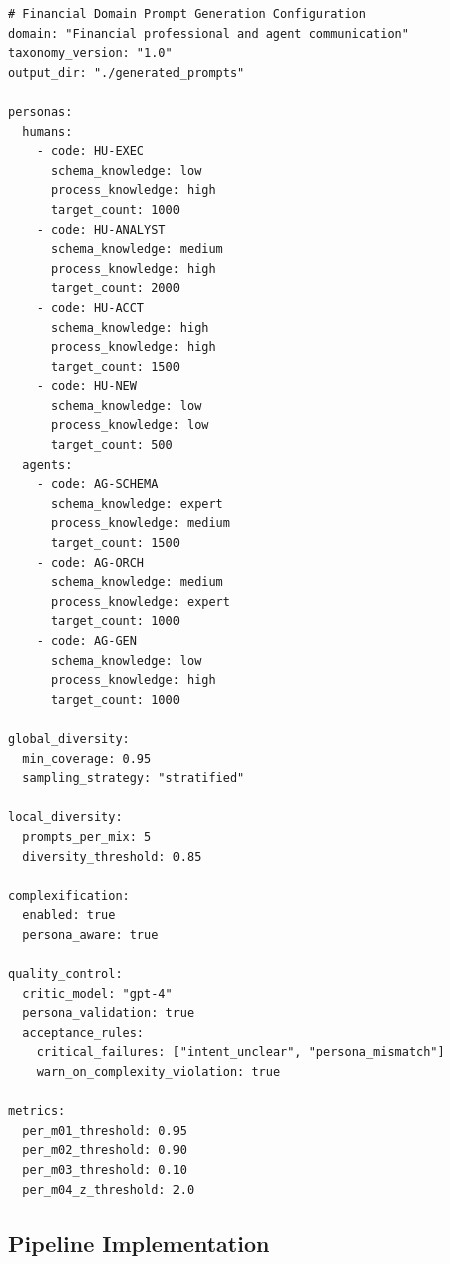 \begin{lstlisting}[language=yamlx,caption={financial\_prompt\_config.yaml}]
# Financial Domain Prompt Generation Configuration
domain: "Financial professional and agent communication"
taxonomy_version: "1.0"
output_dir: "./generated_prompts"

personas:
  humans:
    - code: HU-EXEC
      schema_knowledge: low
      process_knowledge: high
      target_count: 1000
    - code: HU-ANALYST
      schema_knowledge: medium
      process_knowledge: high
      target_count: 2000
    - code: HU-ACCT
      schema_knowledge: high
      process_knowledge: high
      target_count: 1500
    - code: HU-NEW
      schema_knowledge: low
      process_knowledge: low
      target_count: 500
  agents:
    - code: AG-SCHEMA
      schema_knowledge: expert
      process_knowledge: medium
      target_count: 1500
    - code: AG-ORCH
      schema_knowledge: medium
      process_knowledge: expert
      target_count: 1000
    - code: AG-GEN
      schema_knowledge: low
      process_knowledge: high
      target_count: 1000

global_diversity:
  min_coverage: 0.95
  sampling_strategy: "stratified"

local_diversity:
  prompts_per_mix: 5
  diversity_threshold: 0.85

complexification:
  enabled: true
  persona_aware: true

quality_control:
  critic_model: "gpt-4"
  persona_validation: true
  acceptance_rules:
    critical_failures: ["intent_unclear", "persona_mismatch"]
    warn_on_complexity_violation: true

metrics:
  per_m01_threshold: 0.95
  per_m02_threshold: 0.90
  per_m03_threshold: 0.10
  per_m04_z_threshold: 2.0
\end{lstlisting}

\subsection{Pipeline Implementation}


